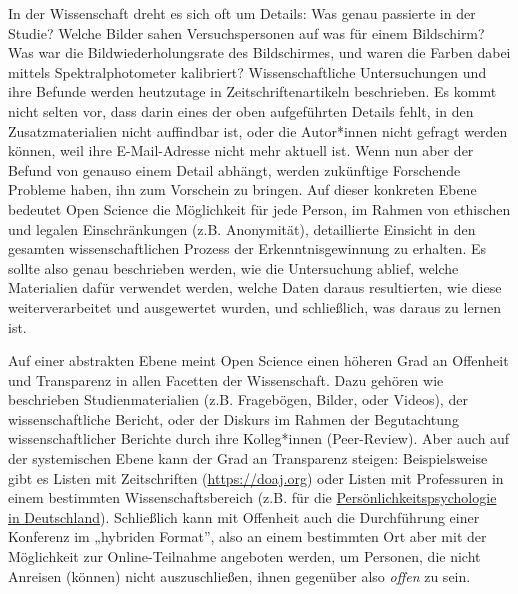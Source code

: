 \documentclass[
  letterpaper,
  DIV=11,
  numbers=noendperiod]{scrreprt}
\begin{document}
In der Wissenschaft dreht es sich oft um Details: Was genau passierte in
der Studie? Welche Bilder sahen Versuchspersonen auf was für einem
Bildschirm? Was war die Bildwiederholungsrate des Bildschirmes, und
waren die Farben dabei mittels Spektralphotometer kalibriert?
Wissenschaftliche Untersuchungen und ihre Befunde werden heutzutage in
Zeitschriftenartikeln beschrieben. Es kommt nicht selten vor, dass darin
eines der oben aufgeführten Details fehlt, in den Zusatzmaterialien
nicht auffindbar ist, oder die Autor*innen nicht gefragt werden können,
weil ihre E-Mail-Adresse nicht mehr aktuell ist. Wenn nun aber der
Befund von genauso einem Detail abhängt, werden zukünftige Forschende
Probleme haben, ihn zum Vorschein zu bringen. Auf dieser konkreten Ebene
bedeutet Open Science die Möglichkeit für jede Person, im Rahmen von
ethischen und legalen Einschränkungen (z.B. Anonymität), detaillierte
Einsicht in den gesamten wissenschaftlichen Prozess der
Erkenntnisgewinnung zu erhalten. Es sollte also genau beschrieben
werden, wie die Untersuchung ablief, welche Materialien dafür verwendet
werden, welche Daten daraus resultierten, wie diese weiterverarbeitet
und ausgewertet wurden, und schließlich, was daraus zu lernen ist.

Auf einer abstrakten Ebene meint Open Science einen höheren Grad an
Offenheit und Transparenz in allen Facetten der Wissenschaft. Dazu
gehören wie beschrieben Studienmaterialien (z.B. Fragebögen, Bilder,
oder Videos), der wissenschaftliche Bericht, oder der Diskurs im Rahmen
der Begutachtung wissenschaftlicher Berichte durch ihre Kolleg*innen
(Peer-Review). Aber auch auf der systemischen Ebene kann der Grad an
Transparenz steigen: Beispielsweise gibt es Listen mit Zeitschriften
(\url{https://doaj.org}) oder Listen mit Professuren in einem bestimmten
Wissenschaftsbereich (z.B. für die
\href{https://docs.google.com/spreadsheets/d/1XwO4n88zkdH1bDGpW6Uz8f4sH24P5FG0ihUp7i0Y-gY/edit\#gid=1684024252}{Persönlichkeitspsychologie
in Deutschland}). Schließlich kann mit Offenheit auch die Durchführung
einer Konferenz im „hybriden Format'', also an einem bestimmten Ort aber
mit der Möglichkeit zur Online-Teilnahme angeboten werden, um Personen,
die nicht Anreisen (können) nicht auszuschließen, ihnen gegenüber also
\emph{offen} zu sein.
\end{document}
